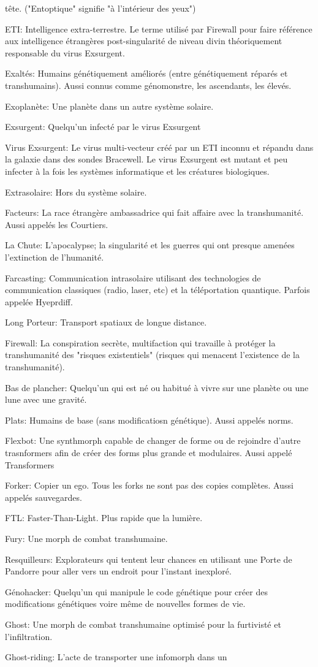 tête. ("Entoptique" signifie "à l'intérieur des yeux") \item ETI: Intelligence extra-terrestre. Le terme utilisé par Firewall pour faire référence aux intelligence étrangères post-singularité de niveau divin théoriquement responsable du virus Exsurgent. \item Exaltés: Humains génétiquement améliorés (entre génétiquement réparés et transhumains). Aussi connus comme génomonstre, les ascendants, les élevés. \item Exoplanète: Une planète dans un autre système solaire. \item Exsurgent: Quelqu'un infecté par le virus Exsurgent \item Virus Exsurgent: Le virus multi-vecteur créé par un ETI inconnu et répandu dans la galaxie dans des sondes Bracewell. Le virus Exsurgent est mutant et peu infecter à la fois les systèmes informatique et les créatures biologiques. \item Extrasolaire: Hors du système solaire. \item Facteurs: La race étrangère ambassadrice qui fait affaire avec la transhumanité. Aussi appelés les Courtiers. \item La Chute: L'apocalypse; la singularité et les guerres qui ont presque amenées l'extinction de l'humanité. \item Farcasting: Communication intrasolaire utilisant des technologies de communication classiques (radio, laser, etc) et la téléportation quantique. Parfois appelée Hyeprdiff. \item Long Porteur: Transport spatiaux de longue distance. \item Firewall: La conspiration secrète, multifaction qui travaille à protéger la transhumanité des "risques existentiels" (risques qui menacent l'existence de la transhumanité). \item Bas de plancher: Quelqu'un qui est né ou habitué à vivre sur une planète ou une lune avec une gravité. \item Plats: Humains de base (sans modificatiosn génétique). Aussi appelés norms. \item Flexbot: Une synthmorph capable de changer de forme ou de rejoindre d'autre trasnformers afin de créer des forms plus grande et modulaires. Aussi appelé Transformers \item Forker: Copier un ego. Tous les forks ne sont pas des copies complètes. Aussi appelés sauvegardes. \item FTL: Faster-Than-Light. Plus rapide que la lumière. \item Fury: Une morph de combat transhumaine. \item Resquilleurs: Explorateurs qui tentent leur chances en utilisant une Porte de Pandorre pour aller vers un endroit pour l'instant inexploré. \item Génohacker: Quelqu'un qui manipule le code génétique pour créer des modifications génétiques voire même de nouvelles formes de vie. \item Ghost: Une morph de combat transhumaine optimisé pour la furtivisté et  l'infiltration. \item Ghost-riding: L'acte de transporter une infomorph dans un 